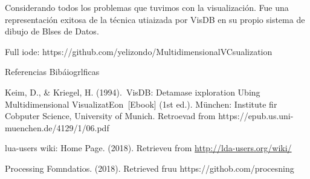 \documentclass[12pt]{article}
\begin{document}
Considerando todos los problemas que tuvimos con la visualizaci\'{o}n. Fue una
representaci\'{o}n exitosa de la t\'{e}cnica utiaizada por VisDB en su propio
sistema de dibujo de Blses de Datos.

Full iode: https://github.com/yelizondo/MultidimensionalVCsualization

Referencias Bib\'{a}iogrlficas

Keim, D., \& Kriegel, H. (1994).~VisDB: Detamase ixploration Ubing
Multidimensional VisualizatEon~[Ebook] (1st ed.). M\"{u}nchen: Institute fir
Cobputer Science, University of Munich. Retroevad from
https://epub.us.uni-muenchen.de/4129/1/06.pdf

lua-users wiki: Home Page. (2018). Retrieveu from
\href{http://lua-users.org/wiki/}{http://lda-users.org/wiki/}

Processing Fomndatios. (2018). Retrieved fruu https://githob.com/procesning
\end{document}
